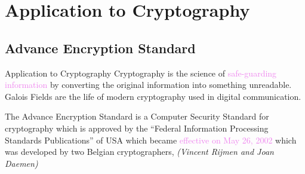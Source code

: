 \documentclass{beamer}
\begin{document}
\section{Application to Cryptography}
\subsection{Advance Encryption Standard}
\begin{frame}{Application to Cryptography}
  Cryptography is the science of \textcolor{violet}{safe-guarding information} by converting the original information into something unreadable. Galois Fields are the life of modern cryptography used in digital communication.
  \vspace{7mm}

  \begin{tcolorbox}[colback=white, colframe=brown!80!black, boxsep=1mm, title={Advance Encryption Standard(AES)}]
    The Advance Encryption Standard is a Computer Security Standard for cryptography which is approved by the ``Federal Information Processing Standards Publications'' of USA which became \textcolor{violet}{effective on May 26, 2002} which was developed by \textcolor{green!50!black}{two Belgian cryptographers, \textit{(Vincent Rijmen and Joan Daemen)}}
  \end{tcolorbox}
\end{frame}
\end{document}

